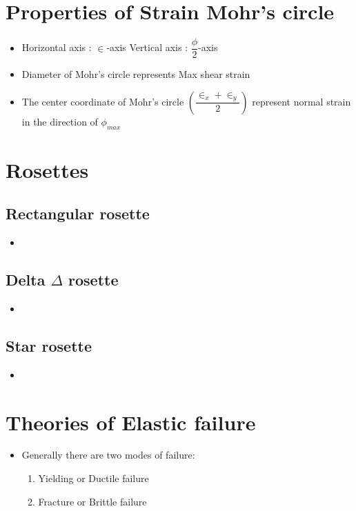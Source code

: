 \documentclass[8pt]{report}
\begin{document}
	\section{Properties of Strain Mohr's circle}
		\begin{itemize}
			\item Horizontal axis : $\in$-axis \hspace{1cm} Vertical axis : $\dfrac{\phi}{2}$-axis
			\item Diameter of Mohr's circle represents Max shear strain
			\item The center coordinate of Mohr's circle $\left(\dfrac{\in_x+\in_y}{2}\right)$ represent normal strain in the direction of $\phi_{max}$		
		\end{itemize}\hrulefill
	\section{Rosettes}
		\subsection{Rectangular rosette}
			\begin{itemize}
				\item
			\end{itemize}\hrulefill
	\subsection{Delta $\Delta$ rosette}
		\begin{itemize}
			\item
		\end{itemize}\hrulefill
	\subsection{Star rosette}
		\begin{itemize}
			\item
		\end{itemize}\hrulefill
	\section{Theories of Elastic failure}
		\begin{itemize}
			\item Generally there are two modes of failure:
				\begin{enumerate}
					\item Yielding or Ductile failure
					\item Fracture or Brittle failure
				\end{enumerate}
		\end{itemize}
\end{document}
